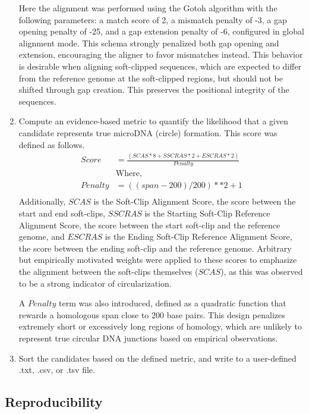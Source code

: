 \documentclass[11pt, letterpaper]{article}
\begin{document}
\begin{enumerate}
    Here the alignment was performed using the Gotoh algorithm with the following parameters: a match score of 2, a mismatch penalty of -3, a gap opening penalty of -25, and a gap extension penalty of -6, configured in global alignment mode. This schema strongly penalized both gap opening and extension, encouraging the aligner to favor mismatches instead. This behavior is desirable when aligning soft-clipped sequences, which are expected to differ from the reference genome at the soft-clipped regions, but should not be shifted through gap creation. This preserves the positional integrity of the sequences.
    \item Compute an evidence-based metric to quantify the likelihood that a given candidate represents true microDNA (circle) formation. This score was defined as follows.
    \begin{align*}
        Score &= \frac{(SCAS * 8 + SSCRAS * 2 + ESCRAS * 2)}{Penalty}\\
        &\text{Where, }\\
        Penalty &= ((span - 200) / 200) ** 2 + 1 \\
    \end{align*}
    Additionally, $SCAS$ is the Soft-Clip Alignment Score, the score between the start and end soft-clips, $SSCRAS$ is the Starting Soft-Clip Reference Alignment Score, the score between the start soft-clip and the reference genome, and $ESCRAS$ is the Ending Soft-Clip Reference Alignment Score, the score between the ending soft-clip and the reference genome. Arbitrary but empirically motivated weights were applied to these scores to emphasize the alignment between the soft-clips themselves ($SCAS$), as this was observed to be a strong indicator of circularization.
    
    A $Penalty$ term was also introduced, defined as a quadratic function that rewards a homologous span close to 200 base pairs. This design penalizes extremely short or excessively long regions of homology, which are unlikely to represent true circular DNA junctions based on empirical observations.
    \item Sort the candidates based on the defined metric, and write to a user-defined .txt, .csv, or .tsv file.
\end{enumerate}

\subsection{Reproducibility}
\end{document}
